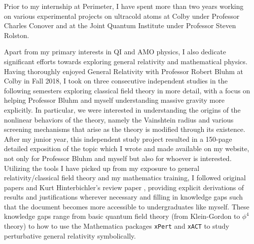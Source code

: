 \documentclass[12pt]{article}
\begin{document}
Prior to my internship at Perimeter, I have spent more than two years working on various experimental projects on ultracold atoms at Colby under Professor Charles Conover and at the Joint Quantum Institute under Professor Steven Rolston. \\ \vspace{-7pt}

Apart from my primary interests in QI and AMO physics, I also dedicate significant efforts towards exploring general relativity and mathematical physics. Having thoroughly enjoyed General Relativity with Professor Robert Bluhm at Colby in Fall 2018, I took on three consecutive independent studies in the following semesters exploring classical field theory in more detail, with a focus on helping Professor Bluhm and myself understanding massive gravity more explicitly. In particular, we were interested in understanding the origins of the nonlinear behaviors of the theory, namely the Vainshtein radius and various screening mechanisms that arise as the theory is modified through its existence. After my junior year, this independent study project resulted in a 150-page detailed exposition of the topic which I wrote and made available on my website, not only for Professor Bluhm and myself but also for whoever is interested. Utilizing the tools I have picked up from my exposure to general relativity/classical field theory and my mathematics training, I followed original papers and Kurt Hinterbichler's review paper \cite{RevModPhys.84.671}, providing explicit derivations of results and justifications wherever necessary and filling in knowledge gaps such that the document becomes more accessible to undergraduates like myself. These knowledge gaps range from basic quantum field theory (from Klein-Gordon to $\phi^4$ theory) to how to use the Mathematica packages \texttt{xPert} and \texttt{xACT} to study perturbative general relativity symbolically. \\ \vspace{-7pt}
\end{document}
